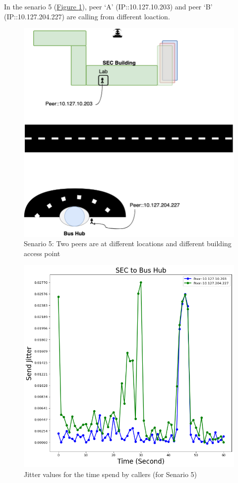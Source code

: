 	In the senario 5 (\hyperref[fig:scene-5]{Figure \ref{fig:scene-5}}), peer `A' (IP::10.127.10.203) and peer `B' (IP::10.127.204.227) are calling from different loaction.
	\begin{figure}[!bh]
		\begin{minipage}{\textwidth}
			\includegraphics[scale=0.29]{Images/experiment/senarios/bus_hub.drawio.png}
		\end{minipage}
		\caption{Senario 5: Two peers are at different locations and different building access point}
		\label{fig:scene-5}
	\end{figure}

	\begin{figure}[!t]
		\begin{minipage}{\textwidth}
			\includegraphics[scale=0.38]{Images/experiment/senarios/df_bus_hub.png}
		\end{minipage}
		\caption{Jitter values for the time spend by callers (for Senario 5)}
		\label{fig:scene-out-5}
	\end{figure}